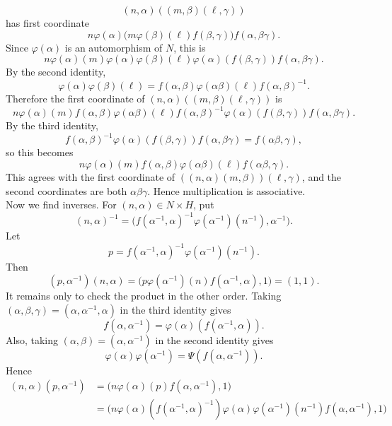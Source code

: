 \documentclass[../Odyssey_Project.tex]{subfiles}
\begin{document}
\begin{solution}
    \[
        (n,\alpha)((m,\beta)(\ell,\gamma))
    \]
    has first coordinate
    \[
        n\varphi(\alpha)\bigl(m\varphi(\beta)(\ell)f(\beta,\gamma)\bigr)f(\alpha,\beta\gamma).
    \]
    Since $\varphi(\alpha)$ is an automorphism of $N$, this is
    \[
        n\varphi(\alpha)(m)\varphi(\alpha)\varphi(\beta)(\ell)\varphi(\alpha)(f(\beta,\gamma))f(\alpha,\beta\gamma).
    \]
    By the second identity,
    \[
        \varphi(\alpha)\varphi(\beta)(\ell)
        =
        f(\alpha,\beta)\varphi(\alpha\beta)(\ell)f(\alpha,\beta)^{-1}.
    \]
    Therefore the first coordinate of $(n,\alpha)((m,\beta)(\ell,\gamma))$ is
    \[
        n\varphi(\alpha)(m)f(\alpha,\beta)\varphi(\alpha\beta)(\ell)
        f(\alpha,\beta)^{-1}\varphi(\alpha)(f(\beta,\gamma))f(\alpha,\beta\gamma).
    \]
    By the third identity,
    \[
        f(\alpha,\beta)^{-1}\varphi(\alpha)(f(\beta,\gamma))f(\alpha,\beta\gamma)
        =
        f(\alpha\beta,\gamma),
    \]
    so this becomes
    \[
        n\varphi(\alpha)(m)f(\alpha,\beta)\varphi(\alpha\beta)(\ell)f(\alpha\beta,\gamma).
    \]
    This agrees with the first coordinate of $((n,\alpha)(m,\beta))(\ell,\gamma)$, and the second coordinates are both $\alpha\beta\gamma$. Hence multiplication is associative. \\
    Now we find inverses. For $(n,\alpha) \in N \times H$, put
    \[
        (n,\alpha)^{-1}
        =
        \bigl(f(\alpha^{-1},\alpha)^{-1}\varphi(\alpha^{-1})(n^{-1}),\alpha^{-1}\bigr).
    \]
    Let
    \[
        p = f(\alpha^{-1},\alpha)^{-1}\varphi(\alpha^{-1})(n^{-1}).
    \]
    Then
    \[
        (p,\alpha^{-1})(n,\alpha)
        =
        \bigl(p\varphi(\alpha^{-1})(n)f(\alpha^{-1},\alpha),1\bigr)
        =
        (1,1).
    \]
    It remains only to check the product in the other order. Taking $(\alpha,\beta,\gamma) = (\alpha,\alpha^{-1},\alpha)$ in the third identity gives
    \[
        f(\alpha,\alpha^{-1})
        =
        \varphi(\alpha)(f(\alpha^{-1},\alpha)).
    \]
    Also, taking $(\alpha,\beta) = (\alpha,\alpha^{-1})$ in the second identity gives
    \[
        \varphi(\alpha)\varphi(\alpha^{-1})
        =
        \Psi(f(\alpha,\alpha^{-1})).
    \]
    Hence
    \begin{align*}
        (n,\alpha)(p,\alpha^{-1})
        &=
        \bigl(n\varphi(\alpha)(p)f(\alpha,\alpha^{-1}),1\bigr) \\
        &=
        \bigl(n\varphi(\alpha)(f(\alpha^{-1},\alpha)^{-1})
        \varphi(\alpha)\varphi(\alpha^{-1})(n^{-1})f(\alpha,\alpha^{-1}),1\bigr) \\

\end{align*}
\end{solution}
\end{document}
